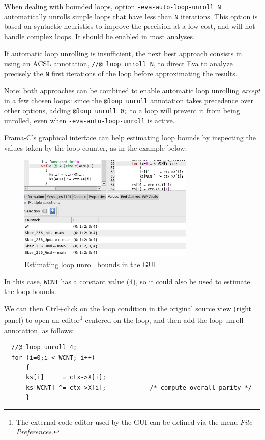 \documentclass[web]{frama-c-book}
\newcommand{\Eva}{\textsf{Eva}}
\begin{document}
When dealing with bounded loops, option \verb+-eva-auto-loop-unroll N+
automatically unrolls simple loops that have less than \verb+N+ iterations.
This option is based on syntactic heuristics to improve the precision
at a low cost, and will not handle complex loops.
It should be enabled in most analyses.

If automatic loop unrolling is insufficient, the next best approach consists in
using an ACSL annotation, \verb+//@ loop unroll N+, to direct \Eva{} to analyze
precisely the \verb+N+ first iterations of the loop before approximating the
results.

Note: both approaches can be combined to enable automatic loop unrolling
{\em except} in a few chosen loops: since the \verb+@loop unroll+ annotation
takes precedence over other options, adding \verb+@loop unroll 0;+ to a loop
will prevent it from being unrolled, even when \verb+-eva-auto-loop-unroll+
is active.

Frama-C's graphical interface can help estimating loop bounds by inspecting the
values taken by the loop counter, as in the example below:

\begin{figure}[hbt]
\centering
\includegraphics[width=0.75\textwidth]{gui-images/gui-loop-to-unroll.png}
\caption{Estimating loop unroll bounds in the GUI}
\label{fig:gui-loop-to-unroll}
\end{figure}

In this case, \verb|WCNT| has a constant value (4), so it could also be used
to estimate the loop bounds.

We can then Ctrl+click on the loop condition in the original source view
(right panel) to open an editor\footnote{The external code editor used by the GUI
  can be defined via the menu {\em File - Preferences}.} centered on the loop, and
then add the loop unroll annotation, as follows:

\begin{lstlisting}
  //@ loop unroll 4;
  for (i=0;i < WCNT; i++)
      {
      ks[i]     = ctx->X[i];
      ks[WCNT] ^= ctx->X[i];            /* compute overall parity */
      }
\end{lstlisting}
\end{document}
